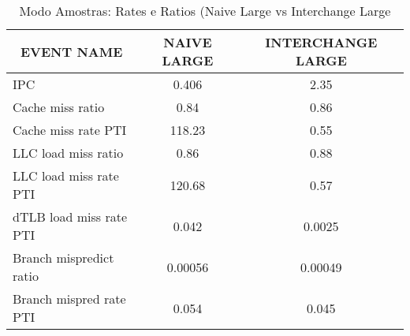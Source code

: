 \documentclass[11pt, oneside]{article}   	%
\begin{document}
\begin{table}[h!]
\centering
\label{table:modo_amostras_ratios}
\begin{tabular}{|l|c|c|}
\hline
\multicolumn{1}{|c|}{\textbf{EVENT NAME}} & \textbf{NAIVE LARGE} & \textbf{INTERCHANGE LARGE} \\ \hline
IPC                                       & 0.406                & 2.35                       \\ \hline
Cache miss ratio                          & 0.84                 & 0.86                       \\ \hline
Cache miss rate PTI                       & 118.23               & 0.55                       \\ \hline
LLC load miss ratio                       & 0.86                 & 0.88                       \\ \hline
LLC load miss rate PTI                    & 120.68               & 0.57                       \\ \hline
dTLB load miss rate PTI                   & 0.042                & 0.0025                     \\ \hline
Branch mispredict ratio                   & 0.00056              & 0.00049                    \\ \hline
Branch mispred rate PTI                   & 0.054                & 0.045                      \\ \hline
\end{tabular}
\caption{Modo Amostras: Rates e Ratios (Naive Large vs Interchange Large}
\end{table}
\end{document}
